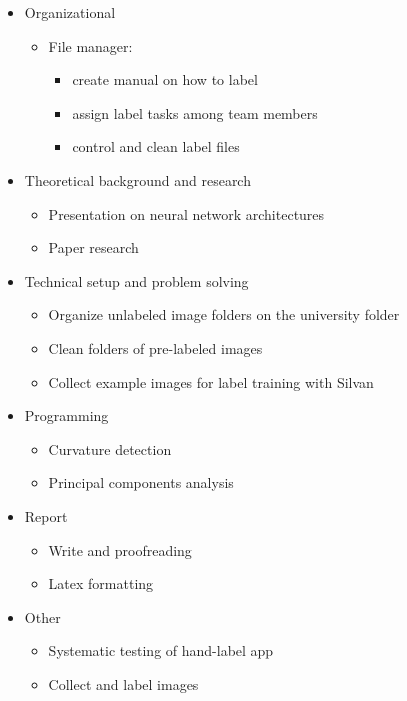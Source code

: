 \begin{itemize}
	\item Organizational
	\begin{itemize}
		\item File manager:
		\begin{itemize}
			\item create manual on how to label
			\item assign label tasks among team members
			\item control and clean label files
		\end{itemize}
	\end{itemize}
	\item Theoretical background and research
	\begin{itemize}
		\item Presentation on neural network architectures
		\item Paper research
	\end{itemize}
	\item Technical setup and problem solving
	\begin{itemize}
		\item Organize unlabeled image folders on the university folder
		\item Clean folders of pre-labeled images
		\item Collect example images for label training with Silvan
	\end{itemize}
	\item Programming
	\begin{itemize}
		\item Curvature detection
		\item Principal components analysis
	\end{itemize}
	\item Report
	\begin{itemize}
		\item Write and proofreading
		\item Latex formatting
	\end{itemize}
	\item Other
	\begin{itemize}
		\item Systematic testing of hand-label app
		\item Collect and label images
	\end{itemize}
\end{itemize}

